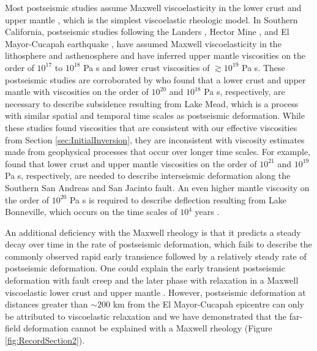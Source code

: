 \documentclass[1p]{elsarticle}
\begin{document}
Most postseismic studies assume Maxwell viscoelasticity in the lower crust and upper mantle \citep[e.g.][]{Nur1974,Pollitz2000,Hetland2003,Freed2006a,Johnson2009,Hearn2009}, which is the simplest viscoelastic rheologic model.  In Southern California, postseismic studies following the Landers \citep{Pollitz2000}, Hector Mine \citep{Pollitz2001}, and El Mayor-Cucapah earthquake \citep{Spinler2015,Rollins2015}, have assumed Maxwell viscoelasticity in the lithosphere and asthenosphere and have inferred upper mantle viscosities on the order of $10^{17}$ to $10^{18}$ Pa s and lower crust viscosities of $\gtrsim 10^{19}$ Pa s.  These postseismic studies are corroborated by \citet{Kaufmann2000} who found that a lower crust and upper mantle with viscosities on the order of $10^{20}$ and $10^{18}$ Pa s, respectively, are necessary to describe subsidence resulting from Lake Mead, which is a process with similar spatial and temporal time scales as postseismic deformation.  While these studies found viscosities that are consistent with our effective viscosities from Section \ref{sec:InitialInversion}, they are inconsistent with viscosity estimates made from geophysical processes that occur over longer time scales. For example, \citet{Lundgren2009} found that lower crust and upper mantle viscosities on the order of $10^{21}$ and $10^{19}$ Pa s, respectively, are needed to describe interseismic deformation along the Southern San Andreas and San Jacinto fault.  An even higher mantle viscosity on the order of $10^{20}$ Pa s is required to describe deflection resulting from Lake Bonneville, which occurs on the time scales of $10^{4}$ years \citep{Crittenden1967,Bills1987}.   

An additional deficiency with the Maxwell rheology is that it predicts a steady decay over time in the rate of postseismic deformation, which fails to describe the commonly observed rapid early transience followed by a relatively steady rate of postseismic deformation.  One could explain the early transient postseismic deformation with fault creep and the later phase with relaxation in a Maxwell viscoelastic lower crust and upper mantle \citep[e.g][]{Hearn2009,Johnson2009}. However, postseismic deformation at distances greater than $\sim200$ km from the El Mayor-Cucapah epicentre can only be attributed to viscoelastic relaxation \citep{Freed2007a} and we have demonstrated that the far-field deformation cannot be explained with a Maxwell rheology (Figure \ref{fig:RecordSection2}). 
\end{document}
